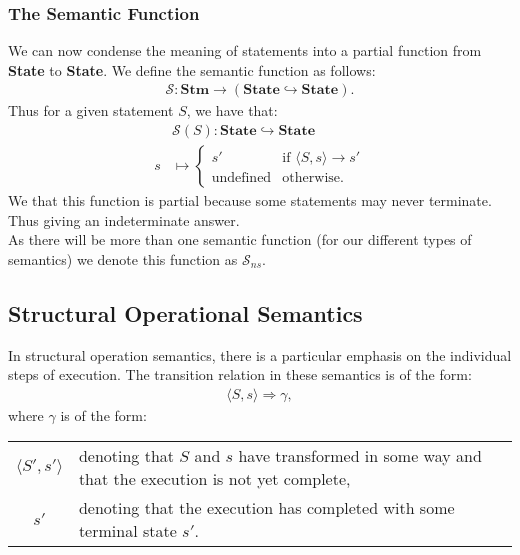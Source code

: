 \documentclass[a4paper, 12pt, twoside]{article}
\begin{document}
\subsubsection{The Semantic Function}

We can now condense the meaning of statements into a partial
function from \textbf{State} to \textbf{State}. We define the semantic
function as follows: \begin{gather*}
  \mathcal{S}: \textbf{Stm} \to (\textbf{State} \hookrightarrow \textbf{State}).
\end{gather*} Thus for a given statement $S$, we have that: \begin{align*}
  &\mathcal{S}(S) : \textbf{State} \hookrightarrow \textbf{State} \\
  s &\mapsto \begin{cases}
    s' & \text{if } \langle S, s \rangle \to s' \\
    \text{undefined} & \text{otherwise}.
  \end{cases}
\end{align*} We that this function is partial because some statements
may never terminate. Thus giving an indeterminate answer.
\\[\baselineskip]
As there will be more than one semantic function (for our different types
of semantics) we denote this function as $\mathcal{S}_{ns}$.

\subsection{Structural Operational Semantics}

In structural operation semantics, there is a particular emphasis
on the individual steps of execution. The transition relation in
these semantics is of the form: \begin{gather*}
  \langle S, s \rangle \Rightarrow \gamma,
\end{gather*} where $\gamma$ is of the form:
\begin{center}
\renewcommand{\arraystretch}{1.5}
\begin{tabular}{ | c || p{8.5cm} | }
  \hline
  $\langle S', s' \rangle$ & denoting that $S$ and $s$
  have transformed in some way and that the execution is not
  yet complete, \\
  $s'$ & denoting that the execution has completed with some 
  terminal state $s'$. \\
  \hline
\end{tabular}
\end{center}
\end{document}
